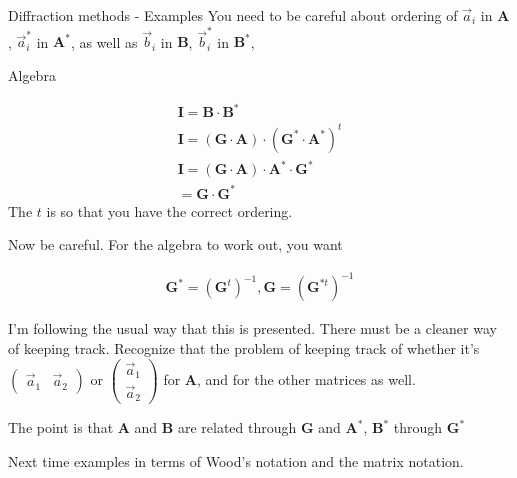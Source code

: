 \documentclass{article}
\newcommand{\matr}[1]{\bm{#1}}
\newcommand{\aone}[0]{\vec{a}_1}
\newcommand{\atwo}[0]{\vec{a}_2}
\newcommand{\pmat}[1]{\begin{pmatrix}#1\end{pmatrix}}
\begin{document}
\begin{section}{Diffraction methods - Examples}
You need to be careful about ordering of $\vec{a}_i$ in $\matr{A}$, $\vec{a}_i^\ast$ in $\matr{A}^\ast$, as well as  $\vec{b}_i$ in $\matr{B}$, $\vec{b}_i^\ast$ in $\matr{B}^\ast$, 

Algebra

\begin{align*}
	\matr{I} = \matr{B}\cdot\matr{B}^\ast\\
	\matr{I} = (\matr{G}\cdot\matr{A})\cdot(\matr{G}^\ast\cdot\matr{A}^\ast)^t\\
	\matr{I} = (\matr{G}\cdot\matr{A})\cdot\matr{A}^\ast\cdot\matr{G}^\ast\\
	 = \matr{G}\cdot\matr{G}^\ast
\end{align*}
The $t$ is so that you have the correct ordering.

Now be careful. For the algebra to work out, you want

\begin{align*}
	\matr{G}^\ast = (\matr{G}^t)^{-1},\matr{G} = (\matr{G}^{\ast t})^{-1}
\end{align*}

I'm following the usual way that this is presented. There must be a cleaner way of keeping track. Recognize that the problem of keeping track of whether it's
$\pmat{\aone&\atwo}$ or $\pmat{\aone\\\atwo}$ for $\matr{A}$, and for the other matrices as well.

The point is that $\matr{A}$ and $\matr{B}$ are related through $\matr{G}$ and $\matr{A}^\ast$, $\matr{B}^\ast$ through $\matr{G}^\ast$

Next time examples in terms of Wood's notation and the matrix notation.
\end{section}
\end{document}
